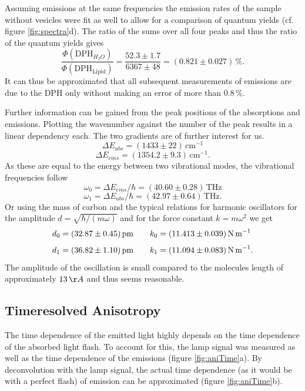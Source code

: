 \documentclass{scrartcl}
\numberwithin{equation}{section}
\numberwithin{figure}{section}
\numberwithin{table}{section}
\newcommand{\eq}[2]{\begin{equation}#1\label{#2}\end{equation}}
\begin{document}
Assuming emissions at the same frequencies the emission rates of the sample without vesicles were fit as well to allow for a comparison of quantum yields (cf. figure \ref{fig:spectra}d). The ratio of the sums over all four peaks and thus the ratio of the quantum yields gives
\eq{\frac{\Phi(\text{DPH}_{H_2 O})}{\Phi(\text{DPH}_{\text{Lipid}})} = \frac{52.3\pm 1.7}{6367\pm 48} = (0.821\pm 0.027)\,\% . }{}
It can thus be approximated that all subsequent measurements of emissions are due to the DPH only without making an error of more than $0.8\,\%$.

Further information can be gained from the peak positions of the absorptions and emissions. Plotting the wavenumber against the number of the peak results in a linear dependency each. The two gradients are of further interest for us.
\eq{ \Delta E_{abs} = (1433\pm 22)\,\text{cm}^{-1} }{}
\eq{ \Delta E_{ems} = (1354.2\pm 9.3)\,\text{cm}^{-1} . }{}
As these are equal to the energy between two vibrational modes, the vibrational frequencies follow
\eq{ \omega_0 = \Delta E_{ems} / \hbar = (40.60\pm 0.28)\,\text{THz} }{}
\eq{ \omega_1 = \Delta E_{abs} / \hbar = (42.97\pm 0.64)\,\text{THz} . }{}
Or using the mass of carbon and the typical relations for harmonic oscillators for the amplitude $d=\sqrt{\hbar / (m\omega)}$ and for the force constant $k=m\omega^2$ we get
\eq{ d_0 = (32.87\pm  0.45)\,\text{pm} \qquad k_0 = (11.413\pm 0.039)\,\text{N\,m}^{-1}\;}{}
\eq{ d_1 = (36.82\pm  1.10)\,\text{pm} \qquad k_1 = (11.094\pm 0.083)\,\text{N\,m}^{-1} .}{}
The amplitude of the oscillation is small compared to the molecules length of approximately $13\,\AA$ and thus seems reasonable.



\subsection{Timeresolved Anisotropy}
The time dependence of the emitted light highly depends on the time dependence of the absorbed light flash. To account for this, the lamp signal was measured as well as the time dependence of the emissions (figure \ref{fig:aniTime}a). By deconvolution with the lamp signal, the actual time dependence (as it would be with a perfect flash) of emission can be approximated (figure \ref{fig:aniTime}b).
\end{document}
